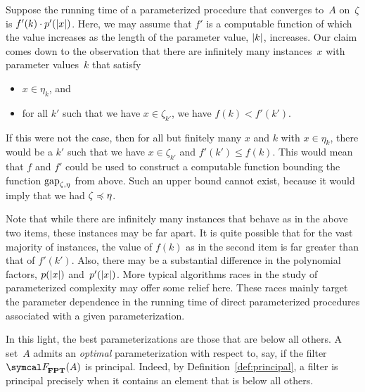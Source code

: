 \begin{example}
  Suppose the running time of a parameterized procedure that converges to~$A$ on~$\zeta$ is $f'(k) \cdot p'({\lvert x\rvert})$.
  Here, we may assume that $f'$ is a computable function of which the value increases as the length of the parameter value, ${\lvert k\rvert}$, increases.
  Our claim comes down to the observation that there are infinitely many instances~$x$ with parameter values~$k$ that satisfy
  \begin{itemize}
  \item $x \in \eta_k$, and
  \item for all $k'$ such that we have $x \in \zeta_{k'}$, we have $f(k) < f'(k')$.
  \end{itemize}
  If this were not the case, then for all but finitely many $x$ and $k$ with $x \in \eta_k$, there would be a $k'$ such that we have $x \in \zeta_{k'}$ and $f'(k') \le f(k)$.
  This would mean that $f$ and $f'$ could be used to construct a computable function bounding the function $\operatorname{gap}_{\zeta, \eta}$ from above.
  Such an upper bound cannot exist, because it would imply that we had $\zeta \preccurlyeq \eta$.

  Note that while there are infinitely many instances that behave as in the above two items, these instances may be far apart.
  It is quite possible that for the vast majority of instances, the value of $f(k)$ as in the second item is far greater than that of $f'(k')$.
  Also, there may be a substantial difference in the polynomial factors, $p({\lvert x\rvert})$ and~$p'({\lvert x\rvert})$.
  More typical algorithms races in the study of parameterized complexity may offer some relief here.
  These races mainly target the parameter dependence in the running time of direct parameterized procedures associated with a given parameterization.
\end{example}

In this light, the best parameterizations are those that are below all others.
A set~$A$ admits an \emph{optimal} parameterization with respect to, say,  if the filter $\calF_\cl{FPT}(A)$ is principal.
Indeed, by Definition~\ref{def:principal}, a filter is principal precisely when it contains an element that is below all others.

